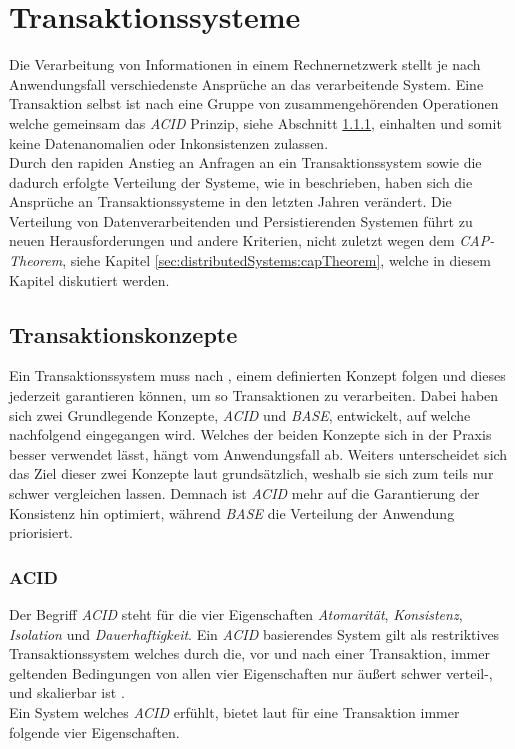 \chapter{Transaktionssysteme}
Die Verarbeitung von Informationen in einem Rechnernetzwerk stellt je nach Anwendungsfall verschiedenste Ansprüche an das verarbeitende System. Eine Transaktion selbst ist nach \cite{rahm1993HochleistungsTransaktionssysteme} eine Gruppe von zusammengehörenden Operationen welche gemeinsam das \textit{ACID} Prinzip, siehe Abschnitt \ref{sec:transactionTheory:acid}, einhalten und somit keine Datenanomalien oder Inkonsistenzen zulassen. \\
Durch den rapiden Anstieg an Anfragen an ein Transaktionssystem sowie die dadurch erfolgte Verteilung der Systeme, wie in \cite{li2017research} beschrieben, haben sich die Ansprüche an Transaktionssysteme in den letzten Jahren verändert. Die Verteilung von Datenverarbeitenden und Persistierenden Systemen führt zu neuen Herausforderungen und andere Kriterien, nicht zuletzt wegen dem \textit{CAP-Theorem}, siehe Kapitel \ref{sec:distributedSystems:capTheorem}, welche in diesem Kapitel diskutiert werden. 

\section{Transaktionskonzepte}
Ein Transaktionssystem muss nach \cite{rahm1993HochleistungsTransaktionssysteme}, einem definierten Konzept folgen und dieses jederzeit garantieren können, um so Transaktionen zu verarbeiten. Dabei haben sich zwei Grundlegende Konzepte, \textit{ACID} und \textit{BASE}, entwickelt, auf welche nachfolgend eingegangen wird. Welches der beiden Konzepte sich in der Praxis besser verwendet lässt, hängt vom Anwendungsfall ab. Weiters
unterscheidet sich das Ziel dieser zwei Konzepte laut \cite{EdlichFriedlandHampeBrauer201010} grundsätzlich, weshalb sie sich zum teils nur schwer vergleichen lassen. Demnach ist \textit{ACID} mehr auf die Garantierung der Konsistenz hin optimiert, während \textit{BASE} die Verteilung der Anwendung priorisiert.

\subsection{ACID}\label{sec:transactionTheory:acid}
Der Begriff \textit{ACID} steht für die vier Eigenschaften \textit{Atomarität}, \textit{Konsistenz}, \textit{Isolation} und \textit{Dauerhaftigkeit}. Ein \textit{ACID} basierendes System gilt als restriktives Transaktionssystem welches durch die, vor und nach einer Transaktion,  immer geltenden Bedingungen von allen vier Eigenschaften nur äußert schwer verteil-, und skalierbar ist \cite{PritchettBASE}.\\
Ein System welches \textit{ACID} erfühlt, bietet laut \cite{haerder198Acid} für eine Transaktion immer folgende vier Eigenschaften.


